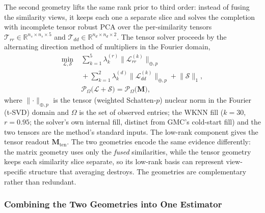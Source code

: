 \documentclass[webpdf,modern,large]{oup-authoring-template}
\newcommand{\R}{\mathbb{R}}
\begin{document}
The second geometry lifts the same rank prior to third order: instead of fusing the similarity views, it keeps each one a separate slice and solves the completion with incomplete tensor robust PCA \citep{yang2023itrpc} over the per-similarity tensors $\boldsymbol{\mathcal{T}}_{rr} \in \R^{n_s\times n_s\times 5}$ and $\boldsymbol{\mathcal{T}}_{dd} \in \R^{n_d\times n_d\times 2}$. The tensor solver proceeds by the alternating direction method of multipliers in the Fourier domain,
\begin{equation}
\begin{split}
\min_{\boldsymbol{\mathcal{L}},\boldsymbol{\mathcal{S}}} \;
&\sum_{k=1}^{5} \lambda_k^{(r)} \lVert \boldsymbol{\mathcal{L}}^{(k)}_{rr} \rVert_{\oplus,p} \\
&{}+ \sum_{k=1}^{2} \lambda_k^{(d)} \lVert \boldsymbol{\mathcal{L}}^{(k)}_{dd} \rVert_{\oplus,p} + \lVert \boldsymbol{\mathcal{S}} \rVert_1, \\
&\boldsymbol{\mathcal{P}}_\Omega\big(\boldsymbol{\mathcal{L}}+\boldsymbol{\mathcal{S}}\big) = \boldsymbol{\mathcal{P}}_\Omega\big(\mathbf{M}\big),
\end{split}
\label{eq:itrpca}
\end{equation}
where $\lVert\cdot\rVert_{\oplus,p}$ is the tensor (weighted Schatten-$p$) nuclear norm in the Fourier (t-SVD) domain and $\Omega$ is the set of observed entries; the WKNN fill ($k=30$, $r=0.95$; the solver's own internal fill, distinct from GMC's cold-start fill) and the two tensors are the method's standard inputs. The low-rank component gives the tensor readout $\mathbf{M}_{\text{ten}}$. The two geometries encode the same evidence differently: the matrix geometry uses only the \emph{fused} similarities, while the tensor geometry keeps each similarity slice separate, so its low-rank basis can represent view-specific structure that averaging destroys. The geometries are complementary rather than redundant.

\subsubsection{Combining the Two Geometries into One Estimator}
\end{document}
